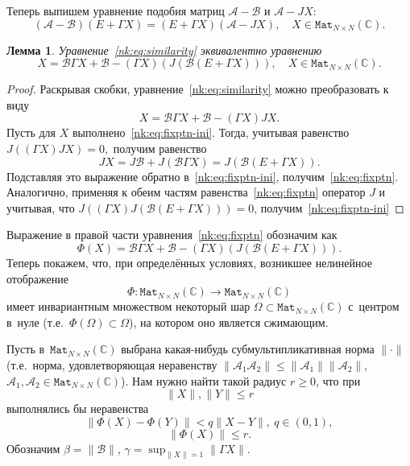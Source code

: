 \documentclass[14pt,a4paper]{extarticle}
\newtheorem{lem}{Лемма}
\theoremstyle{definition}
\begin{document}
Теперь выпишем уравнение подобия матриц \( \mathcal{A} - \mathcal{B} \)
и \( \mathcal{A} - J X \):
\begin{equation}\label{nk:eq:similarity}
    (\mathcal{A-B})(E+\Gamma X) = (E+\Gamma X)(\mathcal{A} - J X), \quad X\in\mathtt{Mat}_{N{\times}N}(\mathbb{C}).
\end{equation}
\begin{lem}
    Уравнение~\eqref{nk:eq:similarity} эквивалентно уравнению
    \begin{equation}\label{nk:eq:fixptn}
        X = \mathcal{B} \Gamma X + \mathcal{B} - (\Gamma X)(J(\mathcal{B} (E + \Gamma X))), \quad X\in\mathtt{Mat}_{N{\times}N}(\mathbb{C}).
    \end{equation}
\end{lem}
\begin{proof}
Раскрывая скобки, уравнение~\eqref{nk:eq:similarity} можно преобразовать к виду
\begin{equation}\label{nk:eq:fixptn-ini}
    X = \mathcal{B} \Gamma X + \mathcal{B} - (\Gamma X) J X.
\end{equation}
Пусть для \( X \) выполнено~\eqref{nk:eq:fixptn-ini}.
Тогда, учитывая равенство \( J\left((\Gamma X)JX\right) = 0, \)
получим равенство
    \begin{equation}\label{nk:eq:jx}
        J X = J\mathcal{B} + J\left(\mathcal{B}\Gamma X\right) = J(\mathcal{B} (E + \Gamma X)).
    \end{equation}
Подставляя это выражение обратно в~\eqref{nk:eq:fixptn-ini},
    получим~\eqref{nk:eq:fixptn}.
Аналогично, применяя к обеим частям равенства~\eqref{nk:eq:fixptn} оператор \( J \)
    и учитывая, что \( J\left( (\Gamma X)J(\mathcal{B} (E + \Gamma X)) \right) = 0 \),
    получим~\eqref{nk:eq:fixptn-ini}
\end{proof}

Выражение в правой части уравнения~\eqref{nk:eq:fixptn} обозначим как
\[
    \Phi(X) = \mathcal{B} \Gamma X + \mathcal{B} - (\Gamma X)(J(\mathcal{B} (E + \Gamma X))).\]
Теперь покажем, что, при определ\"енных условиях,
возникшее нелинейное отображение
\[ \Phi:\mathtt{Mat}_{N{\times}N}(\mathbb{C})\to \mathtt{Mat}_{N{\times}N}(\mathbb{C}) \]
имеет инвариантным множеством
некоторый шар \( \Omega \subset \mathtt{Mat}_{N{\times}N}(\mathbb{C}) \) с~центром в~нуле
(т.е.~\( \Phi(\Omega)\subset\Omega \)),
на котором оно является сжимающим.

Пусть в~\( \mathtt{Mat}_{N{\times}N}(\mathbb{C}) \)
выбрана какая-нибудь суб\-мульти\-пликативная норма \( \|\cdot\| \)
(т.е.~норма, удовле\-творя\-ющая неравенству
 \( \| \mathcal{A}_1\mathcal{A}_2 \| \leq \|\mathcal{A}_1\|\|\mathcal{A}_2\|, \)
 \( \mathcal{A}_1, \mathcal{A}_2 \in \mathtt{Mat}_{N{\times}N}(\mathbb{C}) \)).
Нам нужно найти такой радиус \( r \geq 0 \),
что при \[ \|X\|,\|Y\| \leq r \]
выполнялись бы неравенства
\[ \|\Phi(X) - \Phi(Y)\| < q\|X-Y\|,\ q\in(0,1), \]
\[ \|\Phi(X)\| \leq r. \]
Обозначим
\( \beta = \|\mathcal{B}\| \), \( \gamma = \sup_{\|X\|=1} \|\Gamma X\| \).
\end{document}
